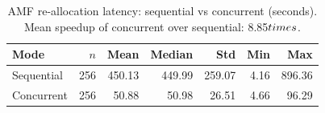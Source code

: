 \begin{table}[htbp]
\centering
\caption{AMF re-allocation latency: sequential vs concurrent (seconds). Mean speedup of concurrent over sequential: 8.85$\\times$.}
\label{tab:comparison}
\begin{tabular}{lrrrrrr}
\hline
Mode & $n$ & Mean & Median & Std & Min & Max \\
\hline
Sequential & 256 & 450.13 & 449.99 & 259.07 & 4.16 & 896.36 \\
Concurrent & 256 & 50.88 & 50.98 & 26.51 & 4.66 & 96.29 \\
\hline
\end{tabular}
\end{table}
